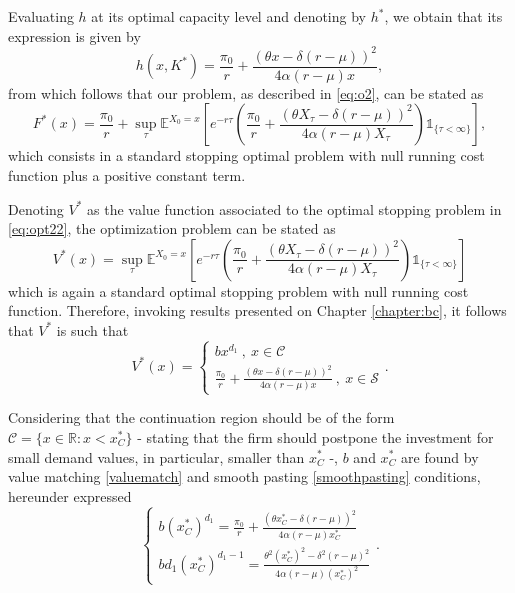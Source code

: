 Evaluating $h$ at its optimal capacity level and denoting by $h^*$, we obtain that its expression is given by
\begin{equation}
h(x,K^*)=\frac{\pi_0}{r} + \frac{(\theta x -\delta (r-\mu))^2}{4 \alpha (r-\mu) x}
,
\label{2_h*} 
\end{equation}
from which follows that our problem, as described in \eqref{eq:o2}, can be stated as
\begin{equation}
F^*(x)=\frac{\pi_0}{r}+ \sup _\tau \mathds{E}^{X_0=x} \left[ e^{-r\tau}   \left( \frac{\pi_0}{r} + \frac{(\theta X_\tau -\delta (r-\mu))^2}{4 \alpha (r-\mu) X_\tau} \right) \mathds{1}_{ \{\tau < \infty \} } \right],
\label{eq:opt22}
\end{equation}
which consists in a standard stopping optimal problem with null running cost function plus a positive constant term.


Denoting $V^*$ as the value function associated to the optimal stopping problem in \eqref{eq:opt22}, the optimization problem can be stated as
\begin{equation}
V^*(x)=\sup _\tau \mathds{E}^{X_0=x} \left[ e^{-r\tau}   \left( \frac{\pi_0}{r} + \frac{(\theta X_\tau -\delta (r-\mu))^2}{4 \alpha (r-\mu) X_\tau} \right) \mathds{1}_{ \{\tau < \infty \} } \right]
\label{2_V*}
\end{equation}
which is again a standard optimal stopping problem with null running cost function. Therefore, invoking results presented on Chapter \ref{chapter:bc}, it follows that $V^*$ is such that
\begin{equation}
V^*(x)=\begin{cases} b x^{d_1}  \ , \ x \in \mathcal{C} \\
\frac{\pi_0}{r}+ \frac{(\theta x -\delta (r-\mu))^2}{4 \alpha (r-\mu) x} \ , \ x \in \mathcal{S}
\end{cases}.
\label{2_V*3}
\end{equation}

Considering that the continuation region should be of the form $\mathcal{C}= \{ x \in \mathds{R}: x< x^*_C \}$ - stating that the firm should postpone the investment for small demand values, in particular, smaller than $x_C^*$ -, $b$ and $x_C^*$ are found by value matching \eqref{valuematch} and smooth pasting \eqref{smoothpasting} conditions, hereunder expressed
\begin{equation}
\begin{cases} b (x_C^*)^{d_1}=\frac{\pi_0}{r} + \frac{(\theta x_C^* -\delta (r-\mu))^2}{4 \alpha (r-\mu) x_C^*}\\
b d_1(x_C^*)^{d_1-1}=\frac{\theta^2 (x_C^*)^2 -\delta^2 (r-\mu)^2}{4 \alpha (r-\mu) (x_C^*)^2}
\end{cases}
.
\label{eq:2_sistema}
\end{equation}

